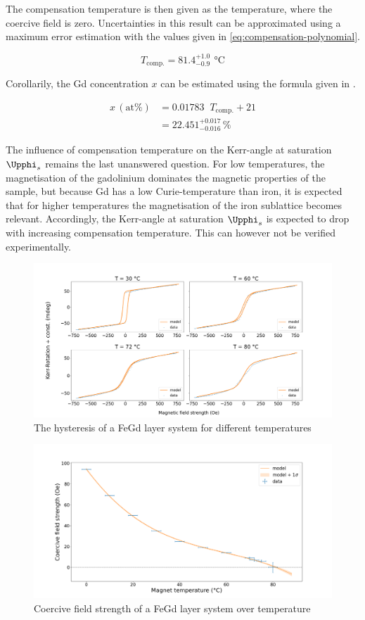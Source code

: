 The compensation temperature is then given as the temperature, where the coercive
field is zero. Uncertainties in this result can be approximated using a maximum
error estimation with the values given in \autoref{eq:compensation-polynomial}.

\begin{equation*}
	T_\text{comp.} = 81.4^{+1.0}_{-0.9}\,\SI{}{\celsius}
\end{equation*}

Corollarily, the Gd concentration $x$ can be estimated using the formula given in
\cite{lab-manual}.

\begin{align*}
\label{eq:Gd-concentration}
	x\,(\text{at} \%) &= 0.01783\;\;T_\text{comp.} + 21 \\[7pt]
	&= 22.451^{+0.017}_{-0.016}\,\%
\end{align*}

The influence of compensation temperature on the Kerr-angle at saturation $\Upphi_s$
remains the last unanswered question. For low temperatures, the magnetisation of the
gadolinium dominates the magnetic properties of the sample, but because Gd has a
low Curie-temperature than iron, it is expected that for higher temperatures the
magnetisation of the iron sublattice becomes relevant. Accordingly, the Kerr-angle
at saturation $\Upphi_s$ is expected to drop with increasing compensation temperature.
This can however not be verified experimentally.

\begin{figure}
	\centering
	\includegraphics[width=1.0\textwidth]{./fig/ferrimagnet_measurement.png}
	\caption{The hysteresis of a FeGd layer system for different temperatures}
	\label{fig:ferrimagnet-measurement}
\end{figure}



\begin{figure}
	\centering
	\includegraphics[width=1.0\textwidth]{./fig/ferrimagnet_t_comp.png}
	\caption{Coercive field strength of a FeGd layer system over temperature}
	\label{fig:compensation-temperature}
\end{figure}
